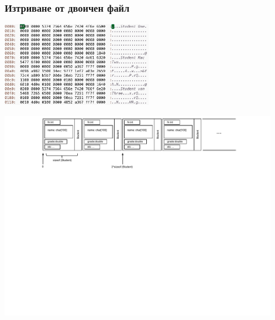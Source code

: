 \documentclass{beamer}
\begin{document}
\begin{frame}[fragile]
\frametitle{Изтриване от двоичен файл}

\begin{flushright}
  \includegraphics[width=6.5cm]{images/binfilesslarger}
\end{flushright}

\vspace{20px}
\includegraphics[width=12cm]{images/binfile}


\end{frame}
\end{document}
